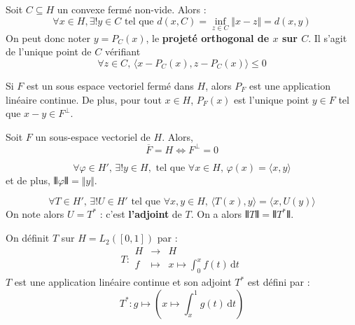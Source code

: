 	\begin{theorem}
		Soit $C \subseteq H$ un convexe fermé non-vide. Alors :
		\[ \forall x \in H, \exists! y \in C \text{ tel que } d(x, C) = \inf_{z \in C} \Vert x - z \Vert = d(x, y) \]
		On peut donc noter $y = P_C(x)$, le \textbf{projeté orthogonal de $x$ sur $C$}. Il s'agit de l'unique point de $C$ vérifiant
		\[ \forall z \in C, \, \langle x - P_C(x), z - P_C(x) \rangle \leq 0 \]
	\end{theorem}

	\begin{theorem}
		Si $F$ est un sous espace vectoriel fermé dans $H$, alors $P_F$ est une application linéaire continue. De plus, pour tout $x \in H$, $P_F(x)$ est l'unique point $y \in F$ tel que $x-y \in F^\perp$.
	\end{theorem}

	\begin{corollary}
		Soit $F$ un sous-espace vectoriel de $H$. Alors,
		\[ \overline{F} = H \iff F^\perp = 0 \]
	\end{corollary}

	\begin{theorem}
		\[ \forall \varphi \in H', \, \exists! y \in H, \text{ tel que } \forall x \in H, \, \varphi(x) = \langle x, y \rangle \]
		et de plus, $\VERT \varphi \VERT = \Vert y \Vert$.
	\end{theorem}

	\begin{corollary}
		\[ \forall T \in H', \, \exists! U \in H' \text{ tel que } \forall x, y \in H, \, \langle T(x), y \rangle = \langle x, U(y) \rangle \]
		On note alors $U = T^*$ : c'est \textbf{l'adjoint} de $T$. On a alors $\VERT T \VERT = \VERT T^* \VERT$.
	\end{corollary}


	\begin{example}
		On définit $T$ sur $H = L_2([0,1])$ par :
		\[
		T : \begin{array}{ccc}
			H &\rightarrow& H \\
			f &\mapsto& x \mapsto \int_{0}^{x} f(t) \, \mathrm{d}t
		\end{array}
		\]
		$T$ est une application linéaire continue et son adjoint $T^*$ est défini par :
		\[ T^* : g \mapsto \left(x \mapsto \int_x^1 g(t) \, \mathrm{d}t \right) \]
	\end{example}

